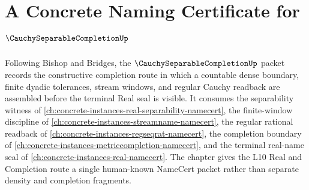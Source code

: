 \chapter{A Concrete Naming Certificate for $\CauchySeparableCompletionUp$}
\label{ch:concrete-instances-cauchy-separable-completion-namecert}

Following Bishop and Bridges, the $\CauchySeparableCompletionUp$ packet records the constructive completion route in which a countable dense boundary, finite dyadic tolerances, stream windows, and regular Cauchy readback are assembled before the terminal Real seal is visible. It consumes the separability witness of \autoref{ch:concrete-instances-real-separability-namecert}, the finite-window discipline of \autoref{ch:concrete-instances-streamname-namecert}, the regular rational readback of \autoref{ch:concrete-instances-regseqrat-namecert}, the completion boundary of \autoref{ch:concrete-instances-metriccompletion-namecert}, and the terminal real-name seal of \autoref{ch:concrete-instances-real-namecert}. The chapter gives the L10 Real and Completion route a single human-known NameCert packet rather than separate density and completion fragments.

